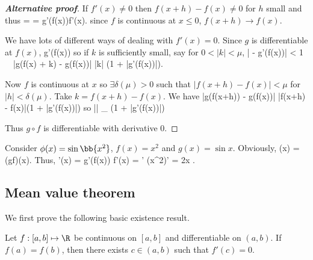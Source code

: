 \begin{proof}[\bf Alternative proof]
If $f'(x) \neq 0$ then $f(x+h) - f(x) \neq 0$ for $h$ small and thus
\be
{} =  \cdot {}  = g'(f(x))\cdot f'(x).
\ee
since $f$ is continuous at $x \leq 0$, $f(x+h) \rightarrow f(x)$.

We have lots of different ways of dealing with $f'(x) = 0$. %
Since $g$ is differentiable at $f(x)$,
\be
{} \rightarrow g'(f(x))
\ee
so if $k$ is sufficiently small, say for $0 < |k| < \mu$,
\be
\Big| - g'(f(x))\Big| < 1 \ \ra \ |g(f(x) + k) - g(f(x))| \leq |k| (1 + |g'(f(x))|).
\ee

Now $f$ is continuous at $x$ so $\exists \delta(\mu) > 0$ such that $|f(x+h) - f(x)| < \mu$ for $|h| < \delta(\mu)$. Take $k = f(x+h) - f(x)$. We have
\be
|g(f(x+h)) - g(f(x))| \leq |f(x+h) - f(x)|(1 + |g'(f(x))|)
\ee
so
\be
\Big|\Big| \leq {}_{} (1 + |g'(f(x))|)
\ee

Thus $g \circ f$ is differentiable with derivative 0.
\end{proof}

\begin{example}
Consider $\phi(x)=\sin \bb{x^2}$, $ f(x)=x^2$ and $g(x)=\sin x$. Obviously,
\be
\phi(x) = (g\circ f)(x).
\ee
Thus,
\be
\phi'(x) = g'(f(x)) f'(x) = ' \cdot (x^2)' = 2x \cos{}.
\ee
\end{example}



\subsection{Mean value theorem}

We first prove the following basic existence result.

\begin{theorem}\label{thm:rolle_analysis}
Let $f: [a,b]\mapsto \R$ be continuous on $[a,b]$ and differentiable on $(a,b)$. If $f(a)=f(b)$, then there exists $c\in (a,b)$ such that $f'(c)=0$.
\end{theorem}

